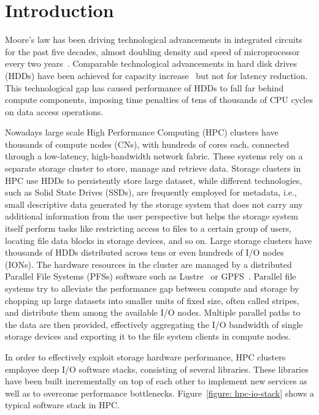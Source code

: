 \chapter{Introduction} \label{cap: introduction}
Moore's law has been driving technological advancements in integrated circuits for the past five decades, almost doubling density and speed of microprocessor every two years~\cite{Mack11}. Comparable
technological advancements in hard disk drives (HDDs) have been achieved for capacity increase~\cite{NIST} but not for latency reduction. This technological gap has caused performance of HDDs to fall 
far behind compute components, imposing time penalties of tens of thousands of CPU cycles on data access operations.

Nowadays large scale High Performance Computing (HPC) clusters have thousands of compute nodes (CNs), with hundreds of cores each, connected through a low-latency, high-bandwidth network fabric. 
These systems rely on a separate storage cluster to store, manage and retrieve data. Storage clusters in HPC use HDDs to persistently store large dataset, while different technologies, such as Solid State
Drives (SSDs), are frequently employed for metadata, i.e., small descriptive data generated by the storage system that does not carry any additional information from the user perspective but helps 
the storage system itself perform tasks like restricting access to files to a certain group of users, locating file data blocks in storage devices, and so on.
Large storage clusters have thousands of HDDs distributed across tens or even hundreds of I/O nodes (IONs). The hardware resources in the cluster are managed by a distributed Parallel File Systems (PFSs) 
software such as Lustre~\cite{Braam02} or GPFS~\cite{SchmuckH02}. Parallel file systems try to alleviate the performance gap between compute and storage by chopping up large datasets into smaller units of
fixed size, often called stripes, and distribute them among the available I/O nodes. Multiple parallel paths to the data are then provided, effectively aggregating the I/O bandwidth of single storage devices 
and exporting it to the file system clients in compute nodes. 

In order to effectively exploit storage hardware performance, HPC clusters employee deep I/O software stacks, consisting of several libraries. These libraries have been built incrementally on top of
each other to implement new services as well as to overcome performance bottlenecks. %
Figure~\ref{figure: hpc-io-stack} shows a typical software stack in HPC.

